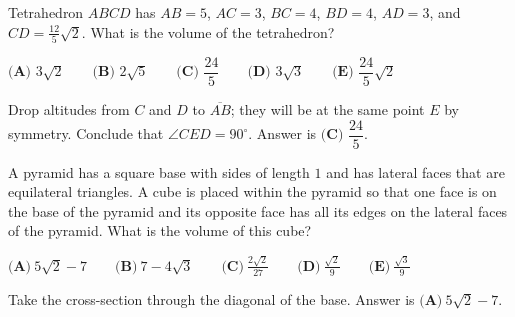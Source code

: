 \documentclass[11pt,twoside]{scrartcl}
\begin{document}
\begin{problem}[2015 AMC 10 A, \#21]
    Tetrahedron $ABCD$ has $AB=5$, $AC=3$, $BC=4$, $BD=4$, $AD=3$, and $CD=\tfrac{12}5\sqrt2$. What is the volume of the tetrahedron?

$\textbf{(A) }3\sqrt2\qquad\textbf{(B) }2\sqrt5\qquad\textbf{(C) }\dfrac{24}5\qquad\textbf{(D) }3\sqrt3\qquad\textbf{(E) }\dfrac{24}5\sqrt2$

    \begin{sketch}
       Drop altitudes from $C$ and $D$ to $\overline{AB}$; they will be at the same point $E$ by symmetry. Conclude that $\angle{CED} = 90^\circ$. Answer is $\boxed{\textbf{(C) }\dfrac{24}5}.$
    \end{sketch}
\end{problem}

\begin{problem}[2011 AMC 10 B, \#22]
    A pyramid has a square base with sides of length $1$ and has lateral faces that are equilateral triangles. A cube is placed within the pyramid so that one face is on the base of the pyramid and its opposite face has all its edges on the lateral faces of the pyramid. What is the volume of this cube?

$\textbf{(A)}\ 5\sqrt{2} - 7 \qquad\textbf{(B)}\ 7 - 4\sqrt{3} \qquad\textbf{(C)}\ \frac{2\sqrt{2}}{27} \qquad\textbf{(D)}\ \frac{\sqrt{2}}{9} \qquad\textbf{(E)}\ \frac{\sqrt{3}}{9}$
    \begin{sketch}
       Take the cross-section through the diagonal of the base. Answer is $\boxed{\textbf{(A)}\ 5\sqrt{2} - 7}.$
    \end{sketch}
\end{problem}
\end{document}
